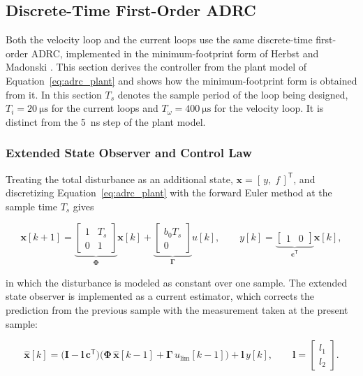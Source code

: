 \subsection{Discrete-Time First-Order ADRC}\label{sec:mfpAdrc}

Both the velocity loop and the current loops use the same discrete-time first-order ADRC, implemented in the minimum-footprint form of Herbst and Madonski \cite{herbst_tuning_2023}. This section derives the controller from the plant model of Equation~\eqref{eq:adrc_plant} and shows how the minimum-footprint form is obtained from it. In this section $T_s$ denotes the sample period of the loop being designed, $T_i = \SI{20}{\micro\second}$ for the current loops and $T_\omega = \SI{400}{\micro\second}$ for the velocity loop. It is distinct from the \SI{5}{\nano\second} step of the plant model.

\subsubsection{Extended State Observer and Control Law}

Treating the total disturbance as an additional state, $\mathbf{x} = [\, y,\; f \,]^{\mathsf{T}}$, and discretizing Equation~\eqref{eq:adrc_plant} with the forward Euler method at the sample time $T_s$ gives

\begin{equation}
	\mathbf{x}[k+1] =
	\underbrace{\begin{bmatrix} 1 & T_s \\ 0 & 1 \end{bmatrix}}_{\boldsymbol{\Phi}}
	\mathbf{x}[k]
	+ \underbrace{\begin{bmatrix} b_0 T_s \\ 0 \end{bmatrix}}_{\boldsymbol{\Gamma}}
	u[k],
	\qquad
	y[k] = \underbrace{\begin{bmatrix} 1 & 0 \end{bmatrix}}_{\mathbf{c}^{\mathsf{T}}}
	\mathbf{x}[k],
	\label{eq:adrc_discrete_model}
\end{equation}

in which the disturbance is modeled as constant over one sample. The extended state observer is implemented as a current estimator, which corrects the prediction from the previous sample with the measurement taken at the present sample:

\begin{equation}
	\hat{\mathbf{x}}[k] = \big( \mathbf{I} - \mathbf{l}\,\mathbf{c}^{\mathsf{T}} \big)
	\Big( \boldsymbol{\Phi}\, \hat{\mathbf{x}}[k-1]
	+ \boldsymbol{\Gamma}\, u_{\mathrm{lim}}[k-1] \Big)
	+ \mathbf{l}\, y[k],
	\qquad
	\mathbf{l} = \begin{bmatrix} l_1 \\ l_2 \end{bmatrix}.
	\label{eq:eso}
\end{equation}

